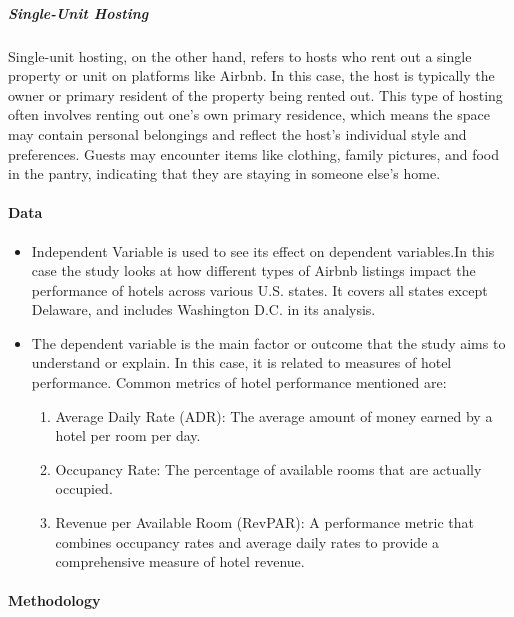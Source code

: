 \documentclass[12pt]{article}
\begin{document}
\subparagraph{Single-Unit Hosting}
Single-unit hosting, on the other hand, refers to hosts who rent out a single property or unit on platforms like Airbnb. In this case, the host is typically the owner or primary resident of the property being rented out. This type of hosting often involves renting out one's own primary residence, which means the space may contain personal belongings and reflect the host's individual style and preferences. Guests may encounter items like clothing, family pictures, and food in the pantry, indicating that they are staying in someone else's home.

\paragraph{Data}

\begin{itemize}

\item Independent Variable is used to see its effect on dependent variables.In this case the study looks at how different types of Airbnb listings impact the performance of hotels across various U.S. states. It covers all states except Delaware, and includes Washington D.C. in its analysis.

\item The dependent variable is the main factor or outcome that the study aims to understand or explain. In this case, it is related to measures of hotel performance. Common metrics of hotel performance mentioned are:

\begin{enumerate}

 \item Average Daily Rate (ADR): The average amount of money earned by a hotel per room per day.
 \item Occupancy Rate: The percentage of available rooms that are actually occupied.
 \item Revenue per Available Room (RevPAR): A performance metric that combines occupancy rates and average daily rates to provide a comprehensive measure of hotel revenue.

\end{enumerate}
\end{itemize}

\paragraph{Methodology}
\end{document}
